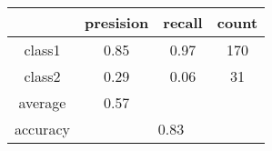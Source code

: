 
    \begin{tabular}{ | c | c | c | c | }
	\hline
	         &presision & recall & count \\ \hline
	class1   & 0.85    & 0.97  & 170 \\ \hline
	class2   & 0.29    & 0.06  & 31 \\ \hline
	average  & 0.57    &        &       \\
	\hline
	accuracy & \multicolumn{3}{c|}{0.83}\\
	\hline
    \end{tabular}